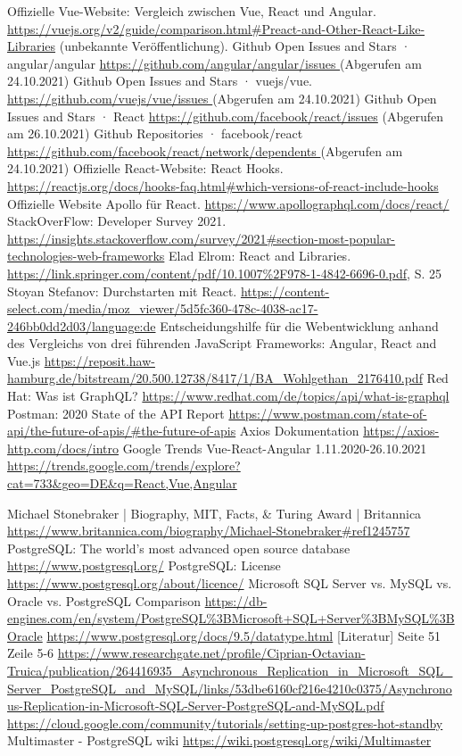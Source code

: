 \begin{thebibliography}{HR08}
   Offizielle Vue-Website: Vergleich zwischen Vue, React und Angular. \url{https://vuejs.org/v2/guide/comparison.html#Preact-and-Other-React-Like-Libraries} (unbekannte Veröffentlichung).
  Github Open Issues and Stars · angular/angular \url{ https://github.com/angular/angular/issues }  (Abgerufen am 24.10.2021)
   Github Open Issues and Stars · vuejs/vue. \url{ https://github.com/vuejs/vue/issues }  (Abgerufen am 24.10.2021)
   Github Open Issues and Stars · React \url{https://github.com/facebook/react/issues} (Abgerufen am 26.10.2021)
   Github Repositories · facebook/react \url{ https://github.com/facebook/react/network/dependents } (Abgerufen am 24.10.2021)
  Offizielle React-Website: React Hooks. \url{https://reactjs.org/docs/hooks-faq.html#which-versions-of-react-include-hooks}
  Offizielle Website Apollo für React. \url{https://www.apollographql.com/docs/react/}
  StackOverFlow: Developer Survey 2021. \url{https://insights.stackoverflow.com/survey/2021#section-most-popular-technologies-web-frameworks}
  Elad Elrom: React and Libraries. \url{https://link.springer.com/content/pdf/10.1007%2F978-1-4842-6696-0.pdf}, S. 25
  Stoyan Stefanov: Durchstarten mit React. \url{https://content-select.com/media/moz_viewer/5d5fc360-478c-4038-ac17-246bb0dd2d03/language:de}
  Entscheidungshilfe für die Webentwicklung anhand des Vergleichs von drei führenden JavaScript Frameworks: Angular, React and Vue.js \url{https://reposit.haw-hamburg.de/bitstream/20.500.12738/8417/1/BA_Wohlgethan_2176410.pdf}
  Red Hat: Was ist GraphQL? \url{https://www.redhat.com/de/topics/api/what-is-graphql}
  Postman: 2020 State of the API Report \url{https://www.postman.com/state-of-api/the-future-of-apis/#the-future-of-apis}
  Axios Dokumentation \url{https://axios-http.com/docs/intro}
  Google Trends Vue-React-Angular 1.11.2020-26.10.2021 \url{https://trends.google.com/trends/explore?cat=733&geo=DE&q=React,Vue,Angular}


   Michael Stonebraker | Biography, MIT, Facts, \& Turing Award | Britannica \url{https://www.britannica.com/biography/Michael-Stonebraker#ref1245757}
   PostgreSQL: The world's most advanced open source database \url{https://www.postgresql.org/}
   PostgreSQL: License \url{https://www.postgresql.org/about/licence/}
   Microsoft SQL Server vs. MySQL vs. Oracle vs. PostgreSQL Comparison \url{https://db-engines.com/en/system/PostgreSQL%3BMicrosoft+SQL+Server%3BMySQL%3BOracle}
   \url{https://www.postgresql.org/docs/9.5/datatype.html}
   [Literatur] Seite 51 Zeile 5-6 \url{https://www.researchgate.net/profile/Ciprian-Octavian-Truica/publication/264416935_Asynchronous_Replication_in_Microsoft_SQL_Server_PostgreSQL_and_MySQL/links/53dbe6160cf216e4210c0375/Asynchronous-Replication-in-Microsoft-SQL-Server-PostgreSQL-and-MySQL.pdf}
   \url{https://cloud.google.com/community/tutorials/setting-up-postgres-hot-standby}
   Multimaster - PostgreSQL wiki \url{https://wiki.postgresql.org/wiki/Multimaster}


\end{thebibliography}
